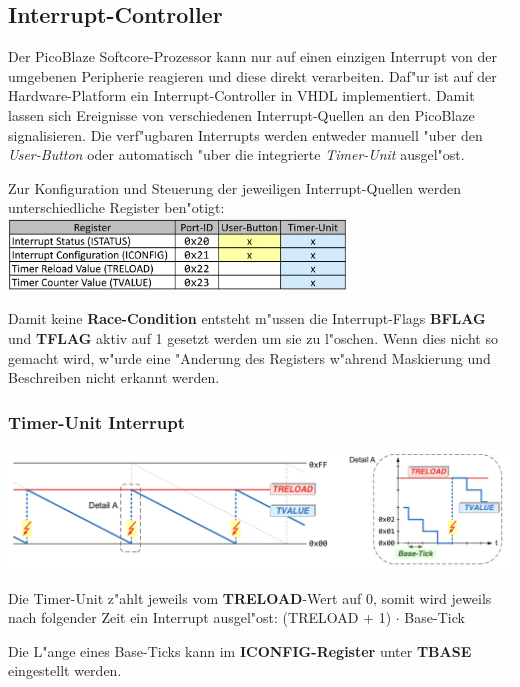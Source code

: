 \subsection{Interrupt-Controller}
Der PicoBlaze Softcore-Prozessor kann nur auf einen einzigen Interrupt von der umgebenen Peripherie reagieren und diese direkt verarbeiten.
Daf"ur ist auf der Hardware-Platform ein Interrupt-Controller in VHDL implementiert. Damit lassen sich Ereignisse von verschiedenen Interrupt-Quellen an den PicoBlaze signalisieren. Die verf"ugbaren Interrupts werden entweder manuell "uber den \textit{User-Button} oder automatisch "uber die integrierte \textit{Timer-Unit} ausgel"ost.

Zur Konfiguration und Steuerung der jeweiligen Interrupt-Quellen werden unterschiedliche Register ben"otigt:\\

\includegraphics[width=9cm]{pics/8-Reg_InterruptController}

Damit keine \textbf{Race-Condition} entsteht m"ussen die Interrupt-Flags \textbf{BFLAG} und \textbf{TFLAG} aktiv auf 1 gesetzt werden um sie zu l"oschen. Wenn dies nicht so gemacht wird, w"urde eine "Anderung des Registers w"ahrend  Maskierung und Beschreiben nicht erkannt werden.

\subsubsection{Timer-Unit Interrupt}
\includegraphics[width=15cm]{pics/8-TimingBlock}

Die Timer-Unit z"ahlt jeweils vom \textbf{TRELOAD}-Wert auf 0, somit wird jeweils nach folgender Zeit ein Interrupt ausgel"ost: (TRELOAD + 1) $\cdot$ Base-Tick

Die L"ange eines Base-Ticks kann im \textbf{ICONFIG-Register} unter \textbf{TBASE} eingestellt werden.

